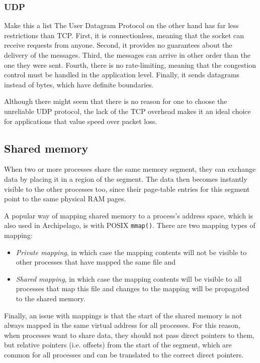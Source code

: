 \subsubsection{UDP}

\fixme Make this a list
The User Datagram Protocol on the other hand has far less restrictions than 
TCP. First, it is connectionless, meaning that the socket can receive requests 
from anyone. Second, it provides no guarantees about the delivery of the 
messages. Third, the messages can arrive in other order than the one they were 
sent. Fourth, there is no rate-limiting, meaning that the congestion control 
must be handled in the application level. Finally, it sends datagrams instead 
of bytes, which have definite boundaries.

Although there might seem that there is no reason for one to choose the 
unreliable UDP protocol, the lack of the TCP overhead makes it an ideal choice 
for applications that value speed over packet loss.

\subsection{Shared memory}

When two or more processes share the same memory segment, they can exchange 
data by placing it in a region of the segment. The data then becomes instantly 
visible to the other processes too, since their page-table entries for this 
segment point to the same physical RAM pages.

A popular way of mapping shared memory to a process's address space, which is 
also used in Archipelago, is with POSIX \texttt{mmap()}. There are two mapping 
types of mapping:

\begin{itemize}
	\item \textit{Private mapping}, in which case the mapping contents will 
		not be visible to other processes that have mapped the same 
		file and
	\item \textit{Shared mapping}, in which case the mapping contents will 
		be visible to all processes that map this file and changes to 
		the mapping will be propagated to the shared memory.
\end{itemize}

Finally, an issue with mappings is that the start of the shared memory is not 
always mapped in the same virtual address for all processes. For this reason, 
when processes want to share data, they should not pass direct pointers to 
them, but relative pointers (i.e. offsets) from the start of the segment, which 
are common for all processes and can be translated to the correct direct 
pointers.

